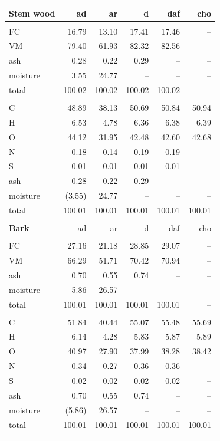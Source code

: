 \documentclass[12pt,titlepage]{article}
\begin{document}
\begin{longtable}{lrrrrr}
    \textbf{Stem wood} & ad & ar & d & daf & cho \\
    \hline \\
    FC       & 16.79  & 13.10  & 17.41  & 17.46  & -- \\
    VM       & 79.40  & 61.93  & 82.32  & 82.56  & -- \\
    ash      & 0.28   & 0.22   & 0.29   & --     & -- \\
    moisture & 3.55   & 24.77  & --     & --     & -- \\
    total    & 100.02 & 100.02 & 100.02 & 100.02 & -- \\
    \\
    C        & 48.89  & 38.13  & 50.69  & 50.84  & 50.94 \\
    H        & 6.53   & 4.78   & 6.36   & 6.38   & 6.39 \\
    O        & 44.12  & 31.95  & 42.48  & 42.60  & 42.68 \\
    N        & 0.18   & 0.14   & 0.19   & 0.19   & -- \\
    S        & 0.01   & 0.01   & 0.01   & 0.01   & -- \\
    ash      & 0.28   & 0.22   & 0.29   & --     & -- \\
    moisture & (3.55) & 24.77  & --     & --     & -- \\
    total    & 100.01 & 100.01 & 100.01 & 100.01 & 100.01 \\
    \\

    \textbf{Bark} & ad & ar & d & daf & cho \\
    \hline \\
    FC       & 27.16  & 21.18  & 28.85  & 29.07  & -- \\
    VM       & 66.29  & 51.71  & 70.42  & 70.94  & -- \\
    ash      & 0.70   & 0.55   & 0.74   & --     & -- \\
    moisture & 5.86   & 26.57  & --     & --     & -- \\
    total    & 100.01 & 100.01 & 100.01 & 100.01 & -- \\
    \\
    C        & 51.84  & 40.44  & 55.07  & 55.48  & 55.69 \\
    H        & 6.14   & 4.28   & 5.83   & 5.87   & 5.89 \\
    O        & 40.97  & 27.90  & 37.99  & 38.28  & 38.42 \\
    N        & 0.34   & 0.27   & 0.36   & 0.36   & -- \\
    S        & 0.02   & 0.02   & 0.02   & 0.02   & -- \\
    ash      & 0.70   & 0.55   & 0.74   & --     & -- \\
    moisture & (5.86) & 26.57  & --     & --     & -- \\
    total    & 100.01 & 100.01 & 100.01 & 100.01 & 100.01 \\
    \\


\end{longtable}
\end{document}
